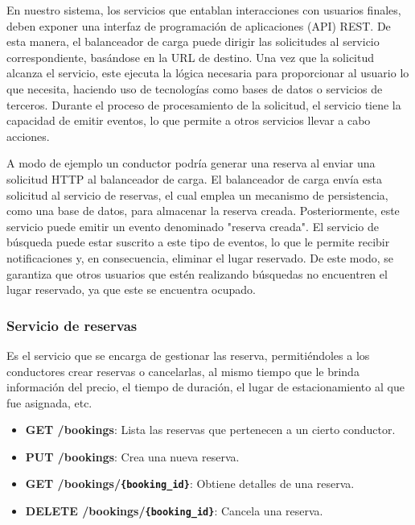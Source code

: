 En nuestro sistema, los servicios que entablan interacciones con usuarios finales, deben exponer una interfaz de programación de aplicaciones (API) REST. De esta manera, el balanceador de carga puede dirigir las solicitudes al servicio correspondiente, basándose en la URL de destino. Una vez que la solicitud alcanza el servicio, este ejecuta la lógica necesaria para proporcionar al usuario lo que necesita, haciendo uso de tecnologías como bases de datos o servicios de terceros. Durante el proceso de procesamiento de la solicitud, el servicio tiene la capacidad de emitir eventos, lo que permite a otros servicios llevar a cabo acciones.

A modo de ejemplo un conductor podría generar una reserva al enviar una solicitud HTTP al balanceador de carga. El balanceador de carga envía esta solicitud al servicio de reservas, el cual emplea un mecanismo de persistencia, como una base de datos, para almacenar la reserva creada. Posteriormente, este servicio puede emitir un evento denominado "reserva creada". El servicio de búsqueda puede estar suscrito a este tipo de eventos, lo que le permite recibir notificaciones y, en consecuencia, eliminar el lugar reservado. De este modo, se garantiza que otros usuarios que estén realizando búsquedas no encuentren el lugar reservado, ya que este se encuentra ocupado.



\subsubsection{Servicio de reservas}
Es el servicio que se encarga de gestionar las reserva, permitiéndoles a los conductores crear reservas o cancelarlas, al mismo tiempo que le brinda información del precio, el tiempo de duración, el lugar de estacionamiento al que fue asignada, etc.


\begin{itemize}
    \item \textbf{GET /bookings}: Lista las reservas que pertenecen a un cierto conductor.
    \item \textbf{PUT /bookings}: Crea una nueva reserva.
    \item \textbf{GET /bookings/\texttt{\{booking\_id\}}}: Obtiene detalles de una reserva.
    \item \textbf{DELETE /bookings/\texttt{\{booking\_id\}}}: Cancela una reserva.
\end{itemize}


